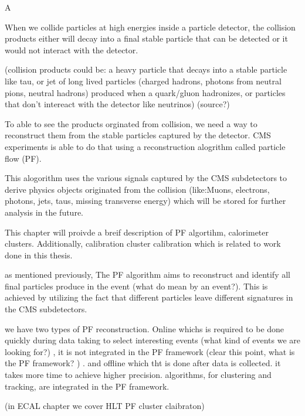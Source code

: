 A%

When we collide particles at high energies inside a particle detector, the collision products either will decay into a final stable particle that can be detected or
it  would not interact with the detector. 

(collision products could be: a heavy particle that decays into a stable particle like tau,
or jet of long lived particles (charged hadrons, photons from neutral pions, neutral hadrons) produced when a quark/gluon hadronizes,
or particles that don't intereact with the detector like neutrinos) (source?) 

To able to see the products orginated from collision, we need a way to reconstruct them from the stable particles captured by the detector.
CMS experiments is able to do that using a reconstruction alogrithm called particle flow (PF).

This alogorithm uses the various signals captured by the CMS subdetectors to derive physics objects originated from the collision (like:Muons, electrons, photons, jets, taus, missing transverse energy)
which will be stored for further analysis in the future.

This chapter will proivde a breif description of PF algortihm, calorimeter clusters. Additionally, calibration cluster calibration which is related to work done in this thesis.  


as mentioned previously, The PF algorithm aims to reconstruct and identify all final particles produce in the event (what do mean by an event?).
This is achieved by utilizing the fact that different particles leave different signatures in the CMS subdetectors.

we have two types of PF reconstruction. Online whichs is required to be done quickly during data taking to select interesting events (what kind of events we are looking for?) , it is not integrated in the PF framework (clear this point, what is the PF framework? ) .
and offline which tht is done after data is collected. it takes more time to achieve higher precision. algorithms, for clustering and tracking, are integrated in the PF framework.

(in ECAL chapter we cover HLT PF cluster claibraton)

